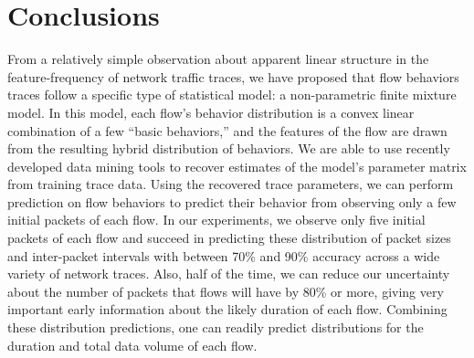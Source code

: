 \documentclass{acm_proc_article-sp}
\begin{document}

\section{Conclusions}

From a relatively simple observation about apparent linear structure in the feature-frequency of network traffic traces, we have proposed that flow behaviors traces follow a specific type of statistical model:
a non-parametric finite mixture model.
In this model, each flow's behavior distribution is a convex linear combination of a few ``basic behaviors,'' and the features of the flow are drawn from the resulting hybrid distribution of behaviors.
We are able to use recently developed data mining tools to recover estimates of the model's parameter matrix from training trace data.
Using the recovered trace parameters, we can perform prediction on flow behaviors to predict their behavior from observing only a few initial packets of each flow.
In our experiments, we observe only five initial packets of each flow and succeed in predicting these distribution of packet sizes and inter-packet intervals with between 70\% and 90\% accuracy across a wide variety of network traces.
Also, half of the time, we can reduce our uncertainty about the number of packets that flows will have by 80\% or more, giving very important early information about the likely duration of each flow.
Combining these distribution predictions, one can readily predict distributions for the duration and total data volume of each flow.
\end{document}
